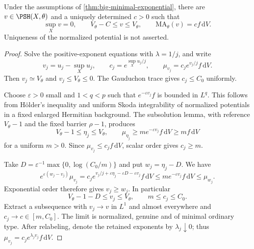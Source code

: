 \begin{theorem}\label{thm:big-minimal-normalized}
Under the assumptions of \cref{thm:big-minimal-exponential}, there are $v\in\PSH(X,\theta)$ and a uniquely determined $c>0$ such that
\[
 \sup_Xv=0,
 \qquad V_\theta-C\leq v\leq V_\theta,
 \qquad \mathrm{MA}_\theta(v)=cf\,\mathrm{d}V.
\]
Uniqueness of the normalized potential is not asserted.
\end{theorem}
\begin{proof}
Solve the positive-exponent equations with $\lambda=1/j$, and write
\[
 v_j=u_j-\sup_Xu_j,\qquad
 c_j=e^{\sup_Xu_j/j},\qquad
 \mu_{v_j}=c_j e^{v_j/j}f\,\mathrm{d}V.
\]
Then $v_j\simeq V_\theta$ and $v_j\leq V_\theta\leq0$. The Gauduchon trace gives $c_j\leq C_0$ uniformly.

Choose $\varepsilon>0$ small and $1<q<p$ such that $e^{-\varepsilon v_j}f$ is bounded in $L^q$. This follows from H\"older's inequality and uniform Skoda integrability of normalized potentials in a fixed enlarged Hermitian background. The subsolution lemma, with reference $V_\theta-1$ and the fixed barrier $\rho-1$, produces
\[
 V_\theta-1\leq\eta_j\leq V_\theta,
 \qquad
 \mu_{\eta_j}\geq m e^{-\varepsilon v_j}f\,\mathrm{d}V
                 \geq mf\,\mathrm{d}V
\]
for a uniform $m>0$. Since $\mu_{v_j}\leq c_jf\,\mathrm{d}V$, scalar order gives $c_j\geq m$.

Take $D=\varepsilon^{-1}\max\{0,\log(C_0/m)\}$ and put $w_j=\eta_j-D$. We have
\[
 e^{\varepsilon(w_j-v_j)}\mu_{v_j}
 =c_j e^{v_j/j+\varepsilon\eta_j-\varepsilon D-\varepsilon v_j}
           f\,\mathrm{d}V
 \leq m e^{-\varepsilon v_j}f\,\mathrm{d}V
 \leq\mu_{w_j}.
\]
Exponential order therefore gives $v_j\geq w_j$. In particular
\begin{equation}\label{eq:big-normalized-uniform-type}
 V_\theta-1-D\leq v_j\leq V_\theta,
 \qquad m\leq c_j\leq C_0.
\end{equation}
Extract a subsequence with $v_j\to v$ in $L^1$ and almost everywhere and $c_j\to c\in[m,C_0]$. The limit is normalized, genuine and of minimal ordinary type. After relabeling, denote the retained exponents by $\lambda_j\downarrow0$; thus $\mu_{v_j}=c_je^{\lambda_jv_j}f\,\mathrm{d}V$.


\end{proof}
